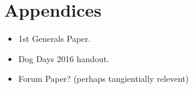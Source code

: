 \documentclass[letterpaper,12pt]{article}
\begin{document}
\section{Appendices}
\begin{itemize}
  \item 1st Generals Paper.
  \item Dog Days 2016 handout.
  \item Forum Paper? (perhaps tangientially relevent)
\end{itemize}
\printbibliography
\end{document}
